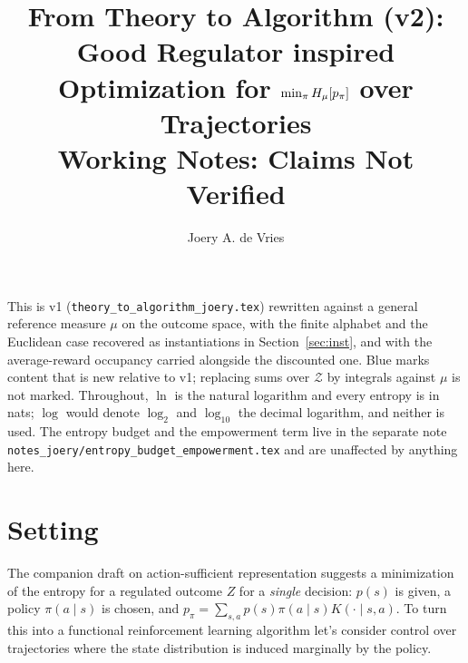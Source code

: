 \documentclass[11pt]{article}
\title{From Theory to Algorithm (v2): Good Regulator inspired Optimization for $\min_\pi H_{\mu}\!\left[p_\pi\right]$ over Trajectories\\
\Large \textbf{Working Notes: Claims Not Verified}}
\author{Joery A. de Vries}
\theoremstyle{remark}
\newcommand{\Zcal}{\mathcal Z}
\newcommand{\1}{\mathds{1}}
\newcommand{\pz}{p_{\pi}}
\newcommand{\new}[1]{\textcolor{blue!70!black}{#1}}
\begin{document}
\maketitle

\noindent
This is v1 (\texttt{theory\_to\_algorithm\_joery.tex}) rewritten against a general reference measure $\mu$ on the outcome space, with the finite alphabet and the Euclidean case recovered as instantiations in Section~\ref{sec:inst}, and with the average-reward occupancy carried alongside the discounted one.
\new{Blue} marks content that is new relative to v1; replacing sums over $\Zcal$ by integrals against $\mu$ is not marked.
Throughout, $\ln$ is the natural logarithm and every entropy is in nats; $\log$ would denote $\log_2$ and $\log_{10}$ the decimal logarithm, and neither is used.
The entropy budget and the empowerment term live in the separate note \nolinkurl{notes_joery/entropy_budget_empowerment.tex} and are unaffected by anything here.

\section{Setting}
\label{sec:setting}

The companion draft on action-sufficient representation suggests a minimization of the entropy for a regulated outcome $Z$ for a \emph{single} decision: $p(s)$ is given, a policy $\pi(a\mid s)$ is chosen, and $\pz=\sum_{s,a}p(s)\pi(a\mid s)K(\cdot\mid s,a)$.
To turn this into a functional reinforcement learning algorithm let's consider control over trajectories where the state distribution is induced marginally by the policy.
\end{document}
